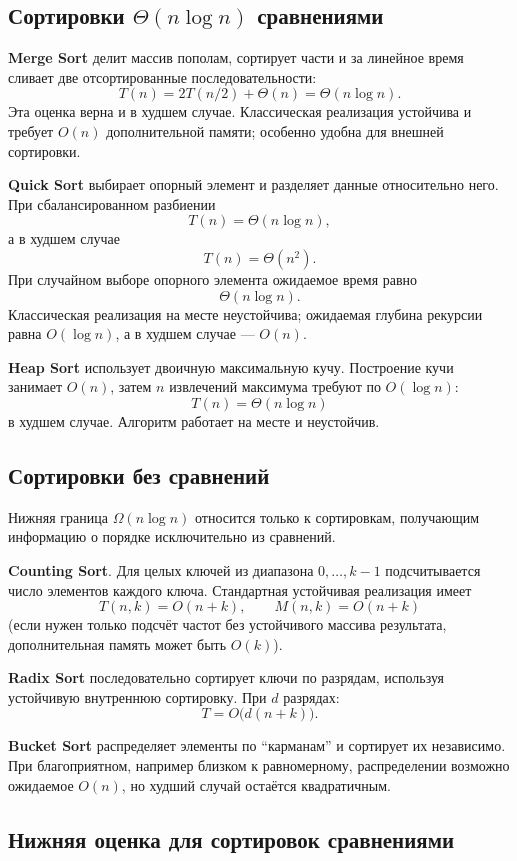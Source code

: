 \subsection[Сортировки порядка n log n сравнениями]{Сортировки $\Theta(n\log n)$ сравнениями}

\textbf{Merge Sort} делит массив пополам, сортирует части и за линейное время сливает две отсортированные последовательности:
\[
T(n)=2T(n/2)+\Theta(n)=\Theta(n\log n).
\]
Эта оценка верна и в худшем случае. Классическая реализация устойчива и требует $O(n)$ дополнительной памяти; особенно удобна для внешней сортировки.

\textbf{Quick Sort} выбирает опорный элемент и разделяет данные относительно него. При сбалансированном разбиении
\[
T(n)=\Theta(n\log n),
\]
а в худшем случае
\[
T(n)=\Theta(n^2).
\]
При случайном выборе опорного элемента ожидаемое время равно
\[\Theta(n\log n).\]
Классическая реализация на месте неустойчива; ожидаемая глубина рекурсии равна $O(\log n)$, а в худшем случае --- $O(n)$.

\textbf{Heap Sort} использует двоичную максимальную кучу. Построение кучи занимает $O(n)$, затем $n$ извлечений максимума требуют по $O(\log n)$:
\[
T(n)=\Theta(n\log n)
\]
в худшем случае. Алгоритм работает на месте и неустойчив.

\subsection{Сортировки без сравнений}

Нижняя граница $\Omega(n\log n)$ относится только к сортировкам, получающим информацию о порядке исключительно из сравнений.

\textbf{Counting Sort}. Для целых ключей из диапазона $0,\ldots,k-1$ подсчитывается число элементов каждого ключа. Стандартная устойчивая реализация имеет
\[
T(n,k)=O(n+k),
\qquad
M(n,k)=O(n+k)
\]
(если нужен только подсчёт частот без устойчивого массива результата, дополнительная память может быть $O(k)$).

\textbf{Radix Sort} последовательно сортирует ключи по разрядам, используя устойчивую внутреннюю сортировку. При $d$ разрядах:
\[
T=O\bigl(d(n+k)\bigr).
\]

\textbf{Bucket Sort} распределяет элементы по ``карманам'' и сортирует их независимо. При благоприятном, например близком к равномерному, распределении возможно ожидаемое $O(n)$, но худший случай остаётся квадратичным.

\subsection{Нижняя оценка для сортировок сравнениями}

